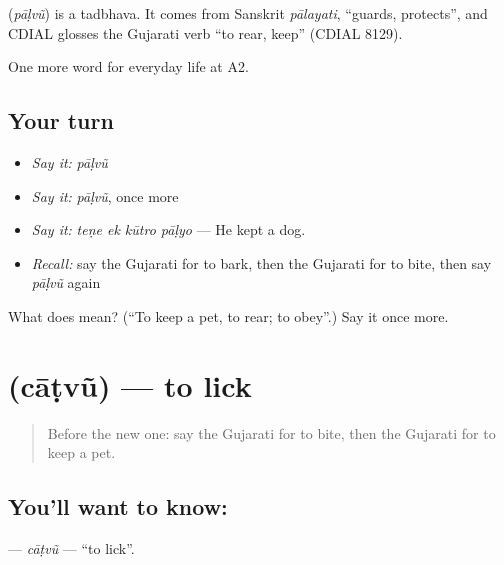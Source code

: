 \begin{cousinweb}
\textbf{} (\emph{pāḷvũ}) is a tadbhava. It comes from Sanskrit \emph{pālayati}, \textquotedblleft{}guards, protects\textquotedblright{}, and CDIAL glosses the Gujarati verb \textquotedblleft{}to rear, keep\textquotedblright{} (CDIAL 8129).
\end{cousinweb}

\begin{grammarlens}[title={What you've built}]
One more word for everyday life at A2.
\end{grammarlens}

\subsection*{Your turn}
\begin{itemize}
\raggedright
  \item \emph{Say it:} \emph{pāḷvũ}
  \item \emph{Say it:} \emph{pāḷvũ}, once more
  \item \emph{Say it:} \emph{teṇe ek kūtro pāḷyo} — He kept a dog.
  \item \emph{Recall:} say the Gujarati for to bark, then the Gujarati for to bite, then say \emph{pāḷvũ} again
\end{itemize}

\begin{tcolorbox}[breakable,colback=teal!4,colframe=teal!35!black,title={Before you move on}]
What does  mean? (\textquotedblleft{}To keep a pet, to rear; to obey\textquotedblright{}.) Say it once more.
\end{tcolorbox}
\section[\texorpdfstring{\gu{ચાટવું} (cāṭvũ)}{ચાટવું (cāṭvũ)}]{ (cāṭvũ) — to lick}

\label{lesson:GU-C235-catvu}



\begin{quote}
Before the new one: say the Gujarati for to bite, then the Gujarati for to keep a pet.
\end{quote}

\subsection*{You'll want to know: }
\textbf{} — \emph{cāṭvũ} — \textquotedblleft{}to lick\textquotedblright{}.

